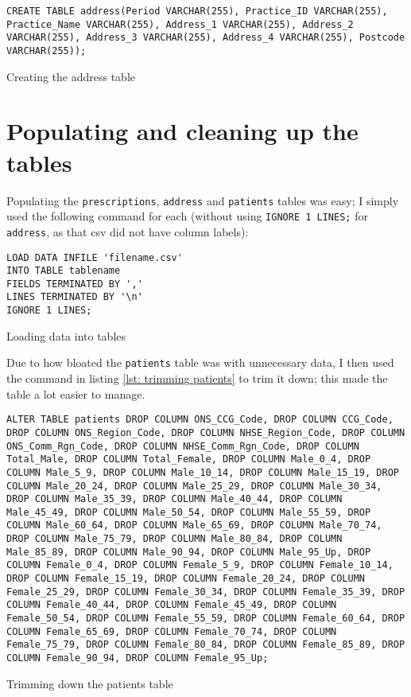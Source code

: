 \documentclass{report}
\begin{document}
\begin{listing}[ht]
\begin{verbatim}
CREATE TABLE address(Period VARCHAR(255), Practice_ID VARCHAR(255), Practice_Name VARCHAR(255), Address_1 VARCHAR(255), Address_2 VARCHAR(255), Address_3 VARCHAR(255), Address_4 VARCHAR(255), Postcode VARCHAR(255));
\end{verbatim}
\caption{Creating the address table}
\label{lst: creating address table}
\end{listing}

\section{Populating and cleaning up the tables}
Populating the \texttt{prescriptions}, \texttt{address} and \texttt{patients} tables was easy; I simply used the following command for each (without using \lstinline{IGNORE 1 LINES;} for \texttt{address}, as that csv did not have column labels):

\begin{listing}
\begin{verbatim}
LOAD DATA INFILE 'filename.csv'
INTO TABLE tablename
FIELDS TERMINATED BY ','
LINES TERMINATED BY '\n'
IGNORE 1 LINES;
\end{verbatim}
\caption{Loading data into tables}
\label{lst: loading data}
\end{listing}

Due to how bloated the \texttt{patients} table was with unnecessary data, I then used the command in listing \ref{lst: trimming patients} to trim it down; this made the table a lot easier to manage.

\begin{listing}[ht]
\begin{verbatim}
ALTER TABLE patients DROP COLUMN ONS_CCG_Code, DROP COLUMN CCG_Code, DROP COLUMN ONS_Region_Code, DROP COLUMN NHSE_Region_Code, DROP COLUMN ONS_Comm_Rgn_Code, DROP COLUMN NHSE_Comm_Rgn_Code, DROP COLUMN Total_Male, DROP COLUMN Total_Female, DROP COLUMN Male_0_4, DROP COLUMN Male_5_9, DROP COLUMN Male_10_14, DROP COLUMN Male_15_19, DROP COLUMN Male_20_24, DROP COLUMN Male_25_29, DROP COLUMN Male_30_34, DROP COLUMN Male_35_39, DROP COLUMN Male_40_44, DROP COLUMN Male_45_49, DROP COLUMN Male_50_54, DROP COLUMN Male_55_59, DROP COLUMN Male_60_64, DROP COLUMN Male_65_69, DROP COLUMN Male_70_74, DROP COLUMN Male_75_79, DROP COLUMN Male_80_84, DROP COLUMN Male_85_89, DROP COLUMN Male_90_94, DROP COLUMN Male_95_Up, DROP COLUMN Female_0_4, DROP COLUMN Female_5_9, DROP COLUMN Female_10_14, DROP COLUMN Female_15_19, DROP COLUMN Female_20_24, DROP COLUMN Female_25_29, DROP COLUMN Female_30_34, DROP COLUMN Female_35_39, DROP COLUMN Female_40_44, DROP COLUMN Female_45_49, DROP COLUMN Female_50_54, DROP COLUMN Female_55_59, DROP COLUMN Female_60_64, DROP COLUMN Female_65_69, DROP COLUMN Female_70_74, DROP COLUMN Female_75_79, DROP COLUMN Female_80_84, DROP COLUMN Female_85_89, DROP COLUMN Female_90_94, DROP COLUMN Female_95_Up;
\end{verbatim}
\caption{Trimming down the patients table}
\label{lst: trimming patients}
\end{listing}
\end{document}
